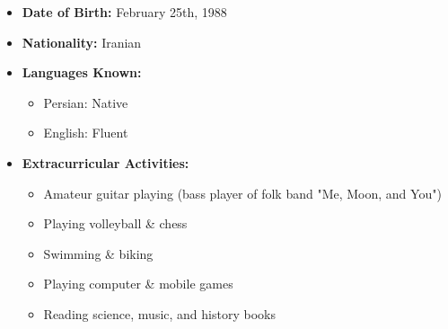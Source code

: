\documentclass{cv}
\begin{document}
\begin{itemize}

\item
\textbf{Date of Birth:}
February 25th, 1988


\item
{\bf Nationality:}
Iranian

\item
\textbf{Languages Known:}
\begin{itemize}

\item
Persian: Native

\item
English: Fluent
%
\end{itemize}

\item
\textbf{Extracurricular Activities:}

\begin{itemize}
\item
Amateur guitar playing (bass player of folk band "Me, Moon, and You")
\item
Playing volleyball \& chess
\item
Swimming \& biking
\item
Playing computer \& mobile games
\item
Reading science, music, and history books
\end{itemize} 


\end{itemize}

\end{document}
